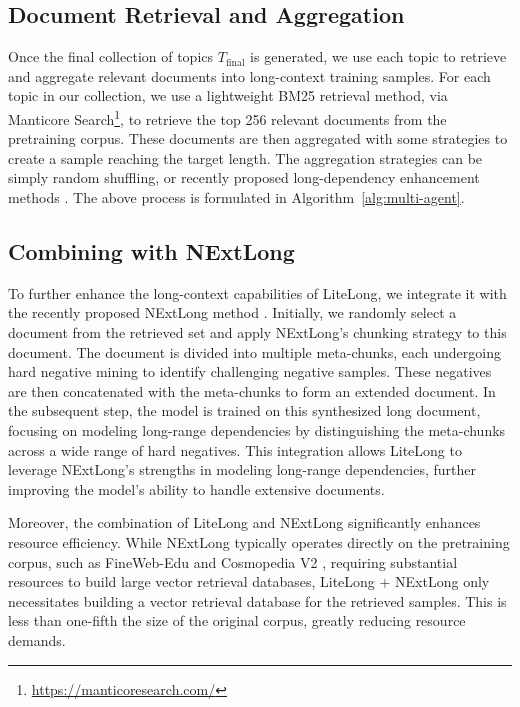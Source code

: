 \documentclass{article}
\theoremstyle{plain}
\theoremstyle{definition}
\theoremstyle{remark}
\begin{document}
\subsection{Document Retrieval and Aggregation}
    Once the final collection of topics $T_{\text{final}}$ is generated, we use each topic to retrieve and aggregate relevant documents into long-context training samples. For each topic in our collection, we use a lightweight BM25 retrieval method, via Manticore Search\footnote{\url{https://manticoresearch.com/}}, to retrieve the top 256 relevant documents from the pretraining corpus. These documents are then aggregated with some strategies to create a sample reaching the target length. The aggregation strategies can be simply random shuffling, or recently proposed long-dependency enhancement methods \cite{tian2024untie,gao2025nextlong}. The above process is formulated in Algorithm~\ref{alg:multi-agent}.
        

 \subsection{Combining with NExtLong}
    To further enhance the long-context capabilities of LiteLong, we integrate it with the recently proposed NExtLong method \cite{gao2025nextlong}. Initially, we randomly select a document from the retrieved set and apply NExtLong's chunking strategy to this document. The document is divided into multiple meta-chunks, each undergoing hard negative mining to identify challenging negative samples. These negatives are then concatenated with the meta-chunks to form an extended document. In the subsequent step, the model is trained on this synthesized long document, focusing on modeling long-range dependencies by distinguishing the meta-chunks across a wide range of hard negatives. This integration allows LiteLong to leverage NExtLong's strengths in modeling long-range dependencies, further improving the model's ability to handle extensive documents. 
    
    Moreover, the combination of LiteLong and NExtLong significantly enhances resource efficiency. While NExtLong typically operates directly on the pretraining corpus, such as FineWeb-Edu \cite{lozhkov2024finewebedu} and Cosmopedia V2 \cite{benallal2024smollmcorpus}, requiring substantial resources to build large vector retrieval databases, LiteLong + NExtLong only necessitates building a vector retrieval database for the retrieved samples. This is less than one-fifth the size of the original corpus, greatly reducing resource demands.
\end{document}
